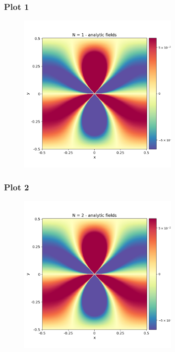 \documentclass{beamer}
\begin{document}

\begin{frame}
    \frametitle{Plot 1}
    \begin{figure}[H]
        \centering
        \includegraphics[width=0.7\textwidth]{../stress_field_01.png}
    \end{figure}
\end{frame}

\begin{frame}
    \frametitle{Plot 2}
    \begin{figure}[H]
        \centering
        \includegraphics[width=0.7\textwidth]{../stress_field_02.png}
    \end{figure}
\end{frame}
\end{document}
